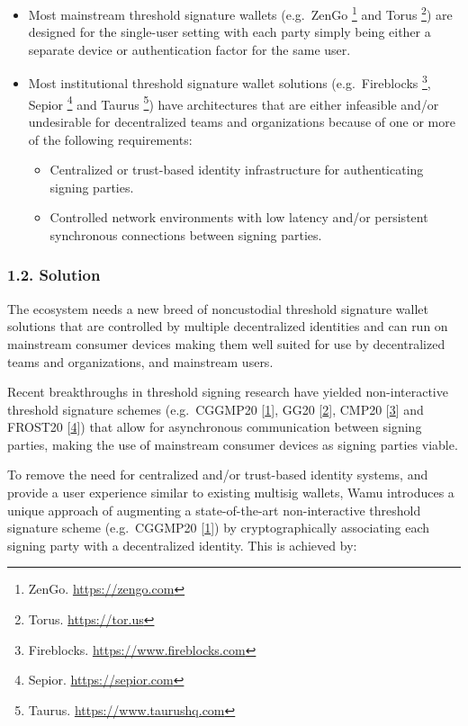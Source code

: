\documentclass[
]{article}
\providecommand{\tightlist}{%
  \setlength{\itemsep}{0pt}\setlength{\parskip}{0pt}}
\begin{document}
\begin{itemize}
\tightlist
\item
  Most mainstream threshold signature wallets (e.g.~ZenGo \footnote{ZenGo.
    \url{https://zengo.com}} and Torus \footnote{Torus.
    \url{https://tor.us}}) are designed for the single-user setting with
  each party simply being either a separate device or authentication
  factor for the same user.
\item
  Most institutional threshold signature wallet solutions
  (e.g.~Fireblocks \footnote{Fireblocks.
    \url{https://www.fireblocks.com}}, Sepior \footnote{Sepior.
    \url{https://sepior.com}} and Taurus \footnote{Taurus.
    \url{https://www.taurushq.com}}) have architectures that are either
  infeasible and/or undesirable for decentralized teams and
  organizations because of one or more of the following requirements:

  \begin{itemize}
  \tightlist
  \item
    Centralized or trust-based identity infrastructure for
    authenticating signing parties.
  \item
    Controlled network environments with low latency and/or persistent
    synchronous connections between signing parties.
  \end{itemize}
\end{itemize}

\hypertarget{solution}{%
\subsubsection{1.2. Solution}\label{solution}}

The ecosystem needs a new breed of noncustodial threshold signature
wallet solutions that are controlled by multiple decentralized
identities and can run on mainstream consumer devices making them well
suited for use by decentralized teams and organizations, and mainstream
users.

Recent breakthroughs in threshold signing research have yielded
non-interactive threshold signature schemes (e.g.~CGGMP20
{[}\protect\hyperlink{ref-cggmp20}{1}{]}, GG20
{[}\protect\hyperlink{ref-gg20}{2}{]}, CMP20
{[}\protect\hyperlink{ref-cmp20}{3}{]} and FROST20
{[}\protect\hyperlink{ref-frost20}{4}{]}) that allow for asynchronous
communication between signing parties, making the use of mainstream
consumer devices as signing parties viable.

To remove the need for centralized and/or trust-based identity systems,
and provide a user experience similar to existing multisig wallets, Wamu
introduces a unique approach of augmenting a state-of-the-art
non-interactive threshold signature scheme (e.g.~CGGMP20
{[}\protect\hyperlink{ref-cggmp20}{1}{]}) by cryptographically
associating each signing party with a decentralized identity. This is
achieved by:
\end{document}
